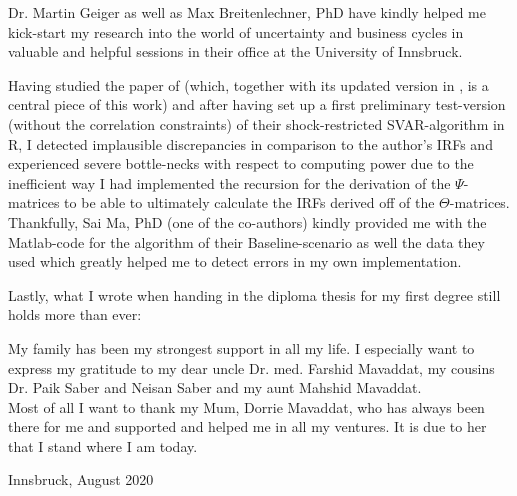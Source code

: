 \documentclass[a4paper,11pt,listof=nochaptergap,oneside,pointednumbers,bibtotoc,bigheadings,liststotoc,hidelinks]{scrbook}
\theoremstyle{mysatz}
\theoremstyle{mydefinition}
\theoremstyle{mytheorem}
\theoremstyle{mybemerkung}
\begin{document}
Dr. Martin Geiger as well as Max Breitenlechner, PhD have kindly helped me kick-start my research into the world of uncertainty and business cycles in valuable and helpful sessions in their office at the University of Innsbruck. 

Having studied the paper of \citet{ludvigsonetal:18} (which, together with its updated version in \citet{ludvigsonetal:19}, is a central piece of this work) and after having set up a first preliminary test-version (without the correlation constraints) of their shock-restricted SVAR-algorithm in R, I detected implausible discrepancies in comparison to the author's IRFs and experienced severe bottle-necks with respect to computing power due to the inefficient way I had implemented the recursion for the derivation of the $\Psi$-matrices to be able to ultimately calculate the IRFs derived off of the $\Theta$-matrices. Thankfully, Sai Ma, PhD (one of the co-authors) kindly provided me with the Matlab-code for the algorithm of their Baseline-scenario as well the data they used which greatly helped me to detect errors in my own implementation.

\newpage
\thispagestyle{empty} %
\vspace*{160px}
Lastly, what I wrote when handing in the diploma thesis for my first degree still holds more than ever:

My family has been my strongest support in all my life. I especially want to express my gratitude to my dear uncle Dr. med. Farshid Mavaddat, my cousins Dr. Paik Saber and Neisan Saber and my aunt Mahshid Mavaddat.\\
Most of all I want to thank my Mum, Dorrie Mavaddat, who has always been there for me and supported and helped me in all my ventures. It is due to her that I stand where I am today.
    \begin{flushright}
         Innsbruck, August 2020\\
    \end{flushright}
\vspace*{\fill}
%
\pagestyle{headings}
\restoregeometry
\end{document}
